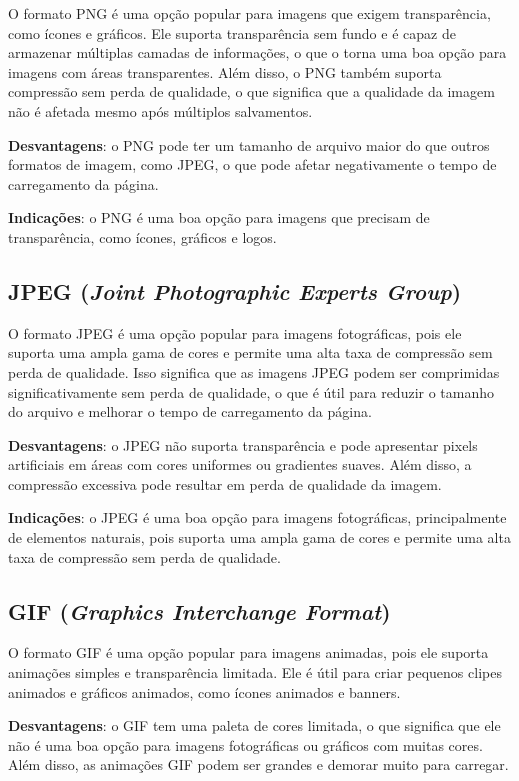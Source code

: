 O formato PNG é uma opção popular para imagens que exigem transparência, como ícones e gráficos. Ele suporta transparência sem fundo e é capaz de armazenar múltiplas camadas de informações, o que o torna uma boa opção para imagens com áreas transparentes. Além disso, o PNG também suporta compressão sem perda de qualidade, o que significa que a qualidade da imagem não é afetada mesmo após múltiplos salvamentos.

\textbf{Desvantagens}: o PNG pode ter um tamanho de arquivo maior do que outros formatos de imagem, como JPEG, o que pode afetar negativamente o tempo de carregamento da página.

\textbf{Indicações}: o PNG é uma boa opção para imagens que precisam de transparência, como ícones, gráficos e logos.

\subsection{JPEG (\textit{Joint Photographic Experts Group})}

O formato JPEG é uma opção popular para imagens fotográficas, pois ele suporta uma ampla gama de cores e permite uma alta taxa de compressão sem perda de qualidade. Isso significa que as imagens JPEG podem ser comprimidas significativamente sem perda de qualidade, o que é útil para reduzir o tamanho do arquivo e melhorar o tempo de carregamento da página.

\textbf{Desvantagens}: o JPEG não suporta transparência e pode apresentar pixels artificiais em áreas com cores uniformes ou gradientes suaves. Além disso, a compressão excessiva pode resultar em perda de qualidade da imagem.

\textbf{Indicações}: o JPEG é uma boa opção para imagens fotográficas, principalmente de elementos naturais, pois suporta uma ampla gama de cores e permite uma alta taxa de compressão sem perda de qualidade.

\subsection{GIF (\textit{Graphics Interchange Format})}

O formato GIF é uma opção popular para imagens animadas, pois ele suporta animações simples e transparência limitada. Ele é útil para criar pequenos clipes animados e gráficos animados, como ícones animados e banners.

\textbf{Desvantagens}: o GIF tem uma paleta de cores limitada, o que significa que ele não é uma boa opção para imagens fotográficas ou gráficos com muitas cores. Além disso, as animações GIF podem ser grandes e demorar muito para carregar.


